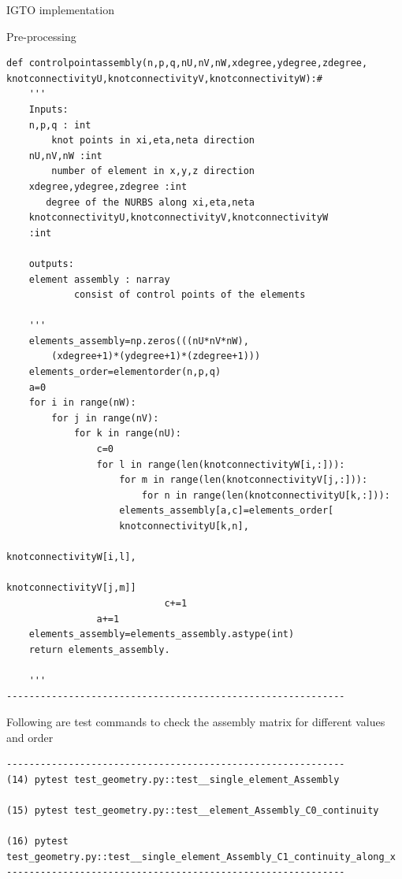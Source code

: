 \documentclass[a4paper,12pt,times]{article}
\begin{document}
\begin{section}{IGTO implementation}
\begin{subsection}{Pre-processing}
\begin{verbatim}
def controlpointassembly(n,p,q,nU,nV,nW,xdegree,ydegree,zdegree,
knotconnectivityU,knotconnectivityV,knotconnectivityW):# 
    '''
    Inputs:
    n,p,q : int
    	knot points in xi,eta,neta direction
    nU,nV,nW :int
    	number of element in x,y,z direction	
    xdegree,ydegree,zdegree :int
       degree of the NURBS along xi,eta,neta
    knotconnectivityU,knotconnectivityV,knotconnectivityW    
    :int
    
    outputs:
    element assembly : narray
    		consist of control points of the elements
    
    '''
    elements_assembly=np.zeros(((nU*nV*nW),
    	(xdegree+1)*(ydegree+1)*(zdegree+1)))
    elements_order=elementorder(n,p,q)
    a=0 
    for i in range(nW):
        for j in range(nV):
            for k in range(nU):
                c=0
                for l in range(len(knotconnectivityW[i,:])):
                    for m in range(len(knotconnectivityV[j,:])):
                        for n in range(len(knotconnectivityU[k,:])):
                    elements_assembly[a,c]=elements_order[
                    knotconnectivityU[k,n],
				                            			knotconnectivityW[i,l], 
                            									knotconnectivityV[j,m]]
                            c+=1
                a+=1         
    elements_assembly=elements_assembly.astype(int)
    return elements_assembly.

    '''
------------------------------------------------------------
\end{verbatim}



Following are test commands to check the assembly matrix for different values and order
\begin{verbatim}
------------------------------------------------------------
(14) pytest test_geometry.py::test__single_element_Assembly

(15) pytest test_geometry.py::test__element_Assembly_C0_continuity

(16) pytest test_geometry.py::test__single_element_Assembly_C1_continuity_along_x
------------------------------------------------------------
\end{verbatim}



\end{subsection}
\end{section}
\end{document}
